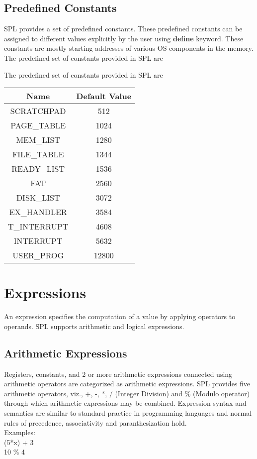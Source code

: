 \documentclass[11pt]{article}
\begin{document}
	
\subsection{Predefined Constants}
SPL provides a set of predefined constants. These predefined constants can be assigned to different values explicitly by the user using \textbf{define} keyword. These constants are mostly starting addresses of various OS components in the memory. The predefined set of constants provided in SPL are


The predefined set of constants provided in SPL are \\
\begin{center}
\begin{tabular}{| c | c |}
\hline
\textbf{Name} & \textbf{Default Value} \\
\hline
SCRATCHPAD 	& 	512 \\
\hline
PAGE\_TABLE 	& 	1024  \\
\hline
MEM\_LIST 	&	1280 	\\
\hline
FILE\_TABLE 	& 	1344		\\
\hline
READY\_LIST 	& 	1536	\\
\hline
FAT 		& 	2560    \\
\hline
DISK\_LIST 	& 	3072 	\\
\hline
EX\_HANDLER & 	3584	\\
\hline
T\_INTERRUPT & 	4608	\\
\hline
INTERRUPT & 	5632	\\
\hline
USER\_PROG 	& 	12800	\\
\hline

\end{tabular}
\end{center}


\section{Expressions}
An expression specifies the computation of a value by applying operators to operands. SPL supports arithmetic and logical expressions.


\subsection{Arithmetic Expressions}
Registers, constants, and 2 or more arithmetic expressions connected using arithmetic operators are categorized as arithmetic expressions. SPL provides five arithmetic operators, viz., +, -, *, / (Integer Division) and \% (Modulo operator) through which arithmetic expressions may be combined. Expression syntax and semantics are similar to standard practice in programming languages and normal rules of precedence, associativity and paranthesization hold.\\
Examples: \\
(5*x) + 3 \\
10 \% 4
\end{document}
